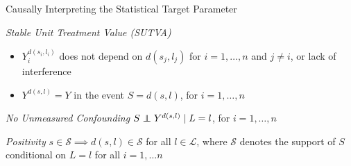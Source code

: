 \documentclass{beamer}
\begin{document}

\begin{frame}[c]{Causally Interpreting the Statistical Target Parameter}

\begin{center}
\begin{tcolorbox}
\begin{assumption}{1}{\textit{Stable Unit Treatment Value (SUTVA)}}\label{sutva}
  \begin{itemize}
    \itemsep2pt
    \item $Y^{d(s_i, l_i)}_i$ does not depend on $d(s_j, l_j)$ for
        $i = 1, \ldots, n$ and $j \neq i$, or lack of
        interference~\citep{cox1958planning}
     \item $Y^{d(s, l)} = Y$ in the event $S = d(s, l)$, for $i = 1, \ldots, n$
  \end{itemize}
\end{assumption}
\end{tcolorbox}
\vspace{-0.7em}
\begin{tcolorbox}
\begin{assumption}{2}{\textit{No Unmeasured Confounding}}\label{ignorability}
  $S \indep Y^{d(s, l)} \mid L = l$, for $i = 1, \ldots, n$
\end{assumption}
\end{tcolorbox}
\vspace{-0.7em}
\begin{tcolorbox}
\begin{assumption}{3}{\textit{Positivity}}\label{positivity}
  $s \in \mathcal{S} \implies d(s, l) \in \mathcal{S}$ for all
  $l \in \mathcal{L}$, where $\mathcal{S}$ denotes the support of $S$
  conditional on $L = l$ for all $i = 1, \ldots n$
\end{assumption}
\end{tcolorbox}
\end{center}


\end{frame}
\end{document}
